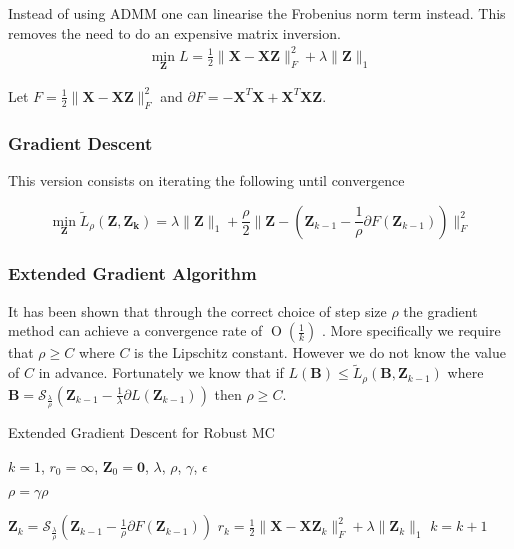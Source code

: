 \documentclass{article}
\newcommand{\BigO}[1]{\ensuremath{\operatorname{O}\left(#1\right)}}
\begin{document}
Instead of using ADMM one can linearise the Frobenius norm term instead. This removes the need to do an expensive matrix inversion.
\begin{align}
\min_{\mathbf Z} L = \frac12\|\mathbf X - \mathbf X\mathbf Z\|^2_F + \lambda\|\mathbf Z\|_{1}
\end{align}

Let $F = \frac12\|\mathbf X - \mathbf X\mathbf Z\|^2_F$ and $\partial F = - \mathbf X^T \mathbf X + \mathbf X^T \mathbf{X Z}$.

\subsubsection{Gradient Descent}

This version consists on iterating the following until convergence

\[
\min_{\mathbf Z} \widetilde{L}_{\rho}(\mathbf{Z, Z_k}) =  \lambda\|\mathbf Z\|_{1} + \frac{\rho}{2} \| \mathbf Z - ( \mathbf Z_{k-1} - \frac{1}{\rho} \partial F(\mathbf Z_{k-1})) \|_F^2
\]

\subsubsection{Extended Gradient Algorithm}

It has been shown that through the correct choice of step size $\rho$ the gradient method can achieve a convergence rate of $\BigO{\frac{1}{k}}$ \cite{ji2009accelerated}. More specifically we require that $\rho \geq C$ where $C$ is the Lipschitz constant. However we do not know the value of $C$ in advance. Fortunately we know that if $L(\mathbf B) \leq \widetilde{L}_{\rho}(\mathbf B, \mathbf Z_{k-1})$ where $\mathbf B = \mathcal S_{\frac{\lambda}{\rho}}(\mathbf Z_{k-1} - \frac1{\lambda}\partial L(\mathbf Z_{k-1}))$ then $\rho \geq C$. 

\begin{algorithm}
\caption{Extended Gradient Descent for Robust MC}
\begin{algorithmic}

\REQUIRE $k = 1$, $r_0 = \infty$, $\mathbf Z_0 = \mathbf 0$, $\lambda$, $\rho$, $\gamma$, $\epsilon$


	
		\STATE $\rho = \gamma \rho$	
	
	\ENDWHILE

	\STATE $\mathbf Z_k = \mathcal S_{\frac{\lambda}{\rho}}(\mathbf Z_{k-1} - \frac1{\rho}\partial F(\mathbf Z_{k-1}))$
	\STATE $r_k = \frac12\|\mathbf X - \mathbf X\mathbf Z_k\|^2_F + \lambda\|\mathbf Z_k\|_{1}$
	\STATE $k = k + 1$
	
\ENDWHILE

\end{algorithmic}
\end{algorithm}
\end{document}
